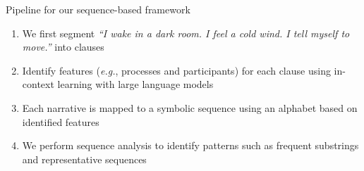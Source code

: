 \documentclass[handout,10pt]{beamer}
\begin{document}
\begin{frame}{Pipeline for our sequence-based framework}
\pause

\begin{enumerate}[<+->]
    \item We first segment \textit{“I wake in a dark room. I feel a cold wind. I tell myself to move.”} into clauses
    \item Identify features (\textit{e.g.}, processes and participants) for each clause using in-context learning with large language models
    \item Each narrative is mapped to a symbolic sequence using an alphabet based on identified features
    \item We perform sequence analysis to identify patterns such as frequent substrings and representative sequences
\end{enumerate}
    
\end{frame}
\end{document}
